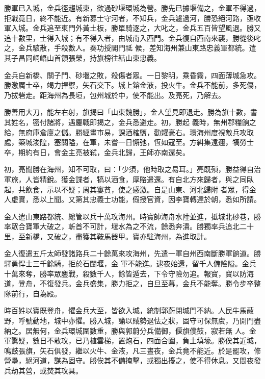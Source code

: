 \begin{pinyinscope}
 勝軍已入城，金兵徑趨城東，欲過砂堰環城為營。勝先已據堰備之，金軍不得過，拒戰竟日，終不能近。有新募士守河者，不知兵，金兵遽過河，勝恐絕河路，亟收軍入城。金兵追至東門外黃土板，勝單騎逐之，大叱之，金兵五百皆望風退。勝又追十數里，士得入城；有不得入者，由城南入西門。金兵復自西南來襲，勝從後叱之，金兵駭散，手殺數人。奏功授閣門祗
 候，差知海州兼山東路忠義軍都統。遣其子昌同峒峿山首領張榮，持旗榜往結山東忠義。



 金兵自新橋、關子門、砂堰之敗，殺傷者眾。一日黎明，乘昏霧，四面薄城急攻。勝激厲士卒，竭力捍禦，矢石交下。城上鎔金液，投火牛。金兵不能前，多死傷，乃拔砦走。距海州為長垣，包州城於中，使不能出。及亮死，乃解去。



 勝善用大刀，能左右射，旗揭曰「山東魏勝」，金人望見即退走。勝為旗十數，書其姓名，密付諸將，遇鏖戰即揭之，金兵悉避走。初，勝起
 義時，無州郡糧餉之給，無府庫倉廩之儲。勝經畫市易，課酒榷鹽，勸糶豪右。環海州度視敵兵攻取處，築城浚隍，塞關隘，在軍，未嘗一日懈弛，恆如寇至。方糾集遠邇，犒勞士卒，期約有日，會金主亮被弒，金兵北歸，王師亦南還矣。



 初，亮聞勝在海州，知不可取，曰：「少須，他時取之易耳。」亮既殞，勝益得自治軍旅，人皆精銳。獲金諜者，犒以酒食，厚賂遣還。有自北方來歸者，與之同臥起，共飲食，示以不疑；周其窶貧，使之感激。自是山東、河北歸附
 者眾，得金人虛實，悉以上聞。又第其忠義士功能，假授官資，因李寶轉達於朝，悉如所請。



 金人遣山東路都統、總管以兵十萬攻海州。時寶帥海舟水陸並進，抵城北砂巷，勝率眾合寶軍大破之，斬首不可計，堰水為之不流，餘悉奔潰。勝獨率兵追北二十里，至新橋，又破之，盡獲其鞍馬器甲。寶亦駐海州，為進取計。



 金人復遣五斤太師發諸路兵二十餘萬來攻海州，先遣一軍自州西南斷勝軍餉道。勝驛勇悍士三千餘騎，拒於石闥堰，金
 軍不能進。逮夜始還，留千人備險隘。金兵十萬來奪，勝率眾鏖戰，殺數千人，餘皆遁去，下令守險勿追。報寶，寶以防海道，登舟，不復發兵。金兵盛集，勝力拒之，自旦至暮，金兵不能奪。勝令步卒整隊前行，自為殿。



 時百姓以寶既登舟，懼金兵大至，皆欲入城，統制郭蔚閉城門不納。人民牛馬蔽野，呼號動地，城中亦懼。勝入城，諭以賊勢退怯之狀，固守可保無虞，乃開門盡納之。居無何，金兵環城圍數重，勝與郭蔚分兵備御，偃旗僕鼓，寂若無
 人。金軍驚疑，數日不敢攻，已乃植雲梯，置炮石，四面合圍，負土填壕。勝俟其近城，鳴鼓張旗，矢石俱發，繼以火牛、金液，凡三晝夜，金兵竟不能近。於是罷攻，修營壘，絕河道，謀為固守。勝俟其不備掩擊，或獨出擾之，使不得休息。又間夜發兵劫其營，或焚其攻具。




\end{pinyinscope}
